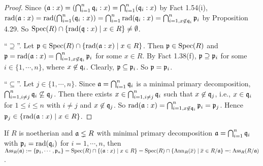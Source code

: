 \begin{proof}
    Since $(\mathfrak{a}:x) = (\bigcap_{i=1}^{n} \mathfrak{q}_i:x) = \bigcap_{i=1}^{n} (\mathfrak{q}_i:x)$ by Fact 1.54(i), $\operatorname{rad}(\mathfrak{a}:x) = \operatorname{rad}(\bigcap_{i=1}^{n}(\mathfrak{q}_i:x)) = \bigcap_{i=1}^{n} \operatorname{rad}(\mathfrak{q}_i:x) = \bigcap_{i=1, x \not \in \mathfrak{q}_i}^{n} \mathfrak{p}_i$ by Proposition 4.29. So $\operatorname{Spec}(R) \cap \{\operatorname{rad}(\mathfrak{q}:x) \mid x \in R\} \neq \emptyset$. \par 
    ``$\supseteq$''. Let $\mathfrak{p} \in \operatorname{Spec}(R) \cap \{\operatorname{rad}(\mathfrak{a}:x) \mid x \in R\}$. Then $\mathfrak{p} \in \operatorname{Spec}(R)$ and $\mathfrak{p} = \operatorname{rad}(\mathfrak{a}:x) = \bigcap_{i=1,x \not \in \mathfrak{q}_i}^{n} \mathfrak{p}_i$ for some $x \in R$. By Fact 1.38(f), $\mathfrak{p} \supseteq \mathfrak{p}_i$ for some $i \in \{1,\cdots,n\}$, where $x \not \in \mathfrak{q}_i$. Clearly, $\mathfrak{p} \subseteq \mathfrak{p}_i$. So $\mathfrak{p} = \mathfrak{p}_i$. \par 
    ``$\subseteq$''. Let $j \in \{1,\cdots,n\}$. Since $\mathfrak{a} = \bigcap_{i=1}^{n}\mathfrak{q}_i$ is a minimal primary decomposition, $\bigcap_{i=1,i \neq j}^{n} \mathfrak{q}_i \not\subseteq \mathfrak{q}_j$. Then there exists $x \in \bigcap_{i=1,i \neq j}^{n} \mathfrak{q}_i$ such that $x \not\in \mathfrak{q}_j$, i.e., $x \in \mathfrak{q}_i$ for $1 \leq i \leq n$ with $i \neq j$ and $x \not \in \mathfrak{q}_j$. So $\operatorname{rad}(\mathfrak{a}:x) = \bigcap_{i=1,x \not \in \mathfrak{q}_i}^{n} \mathfrak{p}_i = \mathfrak{p}_j$. Hence $\mathfrak{p}_j \in \{\operatorname{rad}(\mathfrak{a}:x) \mid x \in R\}$.
\end{proof}

\begin{theorem}
    If $R$ is noetherian and $\mathfrak{a} \lneq R$ with minimal primary decomposition $\mathfrak{a} = \bigcap_{i=1}^{n} \mathfrak{q}_i$ with $\mathfrak{p}_i = \operatorname{rad}(\mathfrak{q}_i)$ for $i = 1,\cdots,n$, then $\operatorname{Ass}_R(\ffa) := \{\ffp_1,\cdots,\ffp_n\} = \operatorname{Spec}(R) \cap \{(\ffa:x) \mid x \in R\} = \operatorname{Spec}(R) \cap \{\operatorname{Ann}_R(\overbar{x}) \mid \overbar{x} \in R/\ffa\} =: \operatorname{Ass}_R(R/\ffa)$.
\end{theorem}


